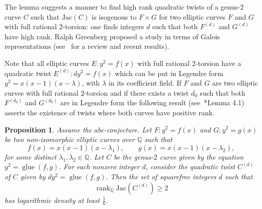 \documentclass{amsart}
\newcommand{\Q}{{\mathbb Q}}
\newcommand{\Jac}{\mathrm{Jac}}
\DeclareMathOperator{\rank}{\mathrm{rank}}
\DeclareMathOperator{\glue}{\mathrm{glue}}
\newtheorem{proposition}{Proposition}[section]
\begin{document}
The lemma suggests a manner to find high rank quadratic twists of a genus-$2$
curve \(C\) such that \(\Jac(C)\) is isogenous to \(F\times G\) for two elliptic
curves \(F\) and \(G\) with full rational \(2\)-torsion: one finds integers \(d\)
such that both \(F^{(d)}\) and \(G^{(d)}\) have high rank. Ralph Greenberg proposed a study in terms of Galois representations (see~\cite{Hatley2017} for a review and recent results).

Note that all elliptic curves $E:y^2=f(x)$ with full rational $2$-torsion have a quadratic twist $E^{(d)}:dy^2=f(x)$ which can be put in Legendre form $y^2=x(x-1)(x-\lambda)$, with $\lambda$ in its coefficient field. If $F$ and $G$ are two elliptic curves with full rational $2$-torsion and if there exists a twist $d_0$ such that both $F^{(d_0)}$ and $G^{(d_0)}$ are in Legendre form the following result (see~\cite{Alaa2017}*{Lemma 4.1}) asserts the existence of twists where both curves have positive rank. 


\begin{proposition}
Assume the $abc$-conjecture. Let $F\colon y^{2}=f(x)$ and $G\colon y^{2}=g(x)$ be two non-isomorphic elliptic curves over $\Q$ such that
\[
f(x)=x(x-1)(x-\lambda_1), \qquad
g(x)=x(x-1)(x-\lambda_2),
\]
for some distinct $\lambda_1,\lambda_2 \in \Q$.
Let $C$ be the genus-$2$ curve given by the equation
$y^{2}=\glue(f,g).$
For each nonzero integer $d$, consider the quadratic twist $C^{(d)}$ of $C$
given by $dy^{2}=\glue(f,g).$
Then the set of squarefree integers $d$ such that
\[
\rank_{\Q}\Jac(C^{(d)})\ge 2
\]
has logarithmic density at least $\frac{1}{6}$.
\end{proposition}
\end{document}
